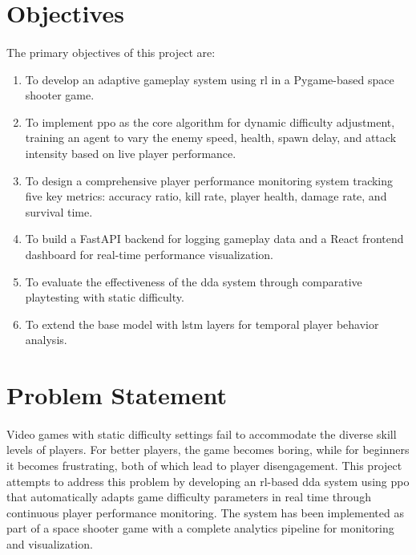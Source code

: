 \section{Objectives}
\paragraph{} The primary objectives of this project are:

\begin{enumerate}
	\item To develop an adaptive gameplay system using \ac{rl} in a Pygame-based space shooter game.
	\item To implement \ac{ppo} as the core algorithm for dynamic difficulty adjustment, training an agent to vary the enemy speed, health, spawn delay, and attack intensity based on live player performance.
	\item To design a comprehensive player performance monitoring system tracking five key metrics: accuracy ratio, kill rate, player health, damage rate, and survival time.
	\item To build a FastAPI backend for logging gameplay data and a React frontend dashboard for real-time performance visualization.
	\item To evaluate the effectiveness of the \ac{dda} system through comparative playtesting with static difficulty.
	\item To extend the base model with \ac{lstm} layers for temporal player behavior analysis.
\end{enumerate}

\section{Problem Statement}
\paragraph{} Video games with static difficulty settings fail to accommodate the diverse skill levels of players. For better players, the game becomes boring, while for beginners it becomes frustrating, both of which lead to player disengagement. This project attempts to address this problem by developing an \ac{rl}-based \ac{dda} system using \ac{ppo} that automatically adapts game difficulty parameters in real time through continuous player performance monitoring. The system has been implemented as part of a space shooter game with a complete analytics pipeline for monitoring and visualization.

